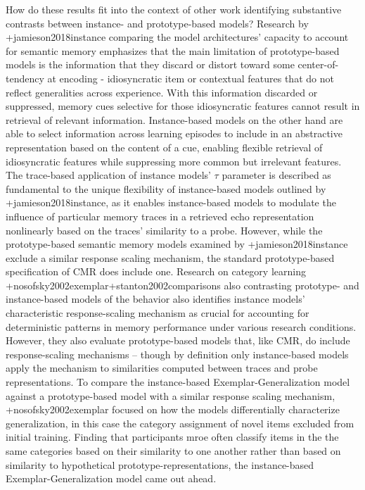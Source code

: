 {}How do these results fit into the context of other work identifying substantive contrasts between instance- and prototype-based models? Research by +{}{}{jamieson2018instance} comparing the model architectures' capacity to account for semantic memory emphasizes that the main limitation of prototype-based models is the information that they discard or distort toward some center-of-tendency at encoding - idiosyncratic item or contextual features that do not reflect generalities across experience. With this information discarded or suppressed, memory cues selective for those idiosyncratic features cannot result in retrieval of relevant information. Instance-based models on the other hand are able to select information across learning episodes to include in an abstractive representation based on the content of a cue, enabling flexible retrieval of idiosyncratic features while suppressing more common but irrelevant features.\markdownRendererInterblockSeparator
{}The trace-based application of instance models' $\tau$ parameter is described as fundamental to the unique flexibility of instance-based models outlined by +{}{}{jamieson2018instance}, as it enables instance-based models to modulate the influence of particular memory traces in a retrieved echo representation nonlinearly based on the traces' similarity to a probe. However, while the prototype-based semantic memory models examined by +{}{}{jamieson2018instance} exclude a similar response scaling mechanism, the standard prototype-based specification of CMR does include one. Research on category learning +{}{}{nosofsky2002exemplar}+{}{}{stanton2002comparisons} also contrasting prototype- and instance-based models of the behavior also identifies instance models' characteristic response-scaling mechanism as crucial for accounting for deterministic patterns in memory performance under various research conditions. However, they also evaluate prototype-based models that, like CMR, do include response-scaling mechanisms -- though by definition only instance-based models apply the mechanism to similarities computed between traces and probe representations. To compare the instance-based Exemplar-Generalization model against a prototype-based model with a similar response scaling mechanism, +{}{}{nosofsky2002exemplar} focused on how the models differentially characterize generalization, in this case the category assignment of novel items excluded from initial training. Finding that participants mroe often classify items in the the same categories based on their similarity to one another rather than based on similarity to hypothetical prototype-representations, the instance-based Exemplar-Generalization model came out ahead.\markdownRendererInterblockSeparator
